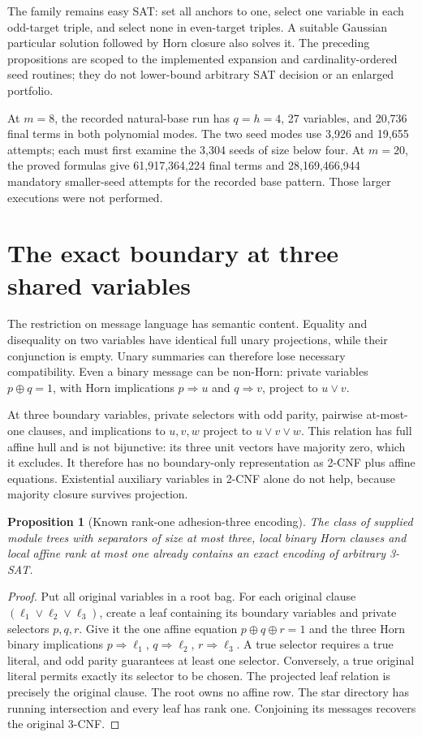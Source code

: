 \documentclass[11pt]{article}
\newtheorem{proposition}[theorem]{Proposition}
\begin{document}
The family remains easy SAT: set all anchors to one, select one variable in
each odd-target triple, and select none in even-target triples. A suitable
Gaussian particular solution followed by Horn closure also solves it.
The preceding propositions are scoped to the implemented expansion and
cardinality-ordered seed routines; they do not lower-bound arbitrary SAT
decision or an enlarged portfolio.

At \(m=8\), the recorded natural-base run has \(q=h=4\), 27 variables,
and 20,736 final terms in both polynomial modes. The two seed modes use
3,926 and 19,655 attempts; each must first examine the 3,304 seeds of size
below four. At \(m=20\), the proved formulas give 61,917,364,224 final terms
and 28,169,466,944 mandatory smaller-seed attempts for the recorded base
pattern. Those larger executions were not performed.

\section{The exact boundary at three shared variables}
The restriction on message language has semantic content. Equality and
disequality on two variables have identical full unary projections, while
their conjunction is empty. Unary summaries can therefore lose necessary
compatibility. Even a binary message can be non-Horn: private variables
\(p\oplus q=1\), with Horn implications \(p\Rightarrow u\) and
\(q\Rightarrow v\), project to \(u\lor v\).

At three boundary variables, private selectors with odd parity, pairwise
at-most-one clauses, and implications to \(u,v,w\) project to
\(u\lor v\lor w\). This relation has full affine hull and is not
bijunctive: its three unit vectors have majority zero, which it excludes.
It therefore has no boundary-only representation as 2-CNF plus affine
equations. Existential auxiliary variables in 2-CNF alone do not help,
because majority closure survives projection.

\begin{proposition}[Known rank-one adhesion-three encoding]
The class of supplied module trees with separators of size at most three,
local binary Horn clauses and local affine rank at most one already contains
an exact encoding of arbitrary 3-SAT.
\end{proposition}
\begin{proof}
Put all original variables in a root bag. For each original clause
\((\ell_1\lor\ell_2\lor\ell_3)\), create a leaf containing its boundary
variables and private selectors \(p,q,r\). Give it the one affine equation
\(p\oplus q\oplus r=1\) and the three Horn binary implications
\(p\Rightarrow\ell_1\), \(q\Rightarrow\ell_2\),
\(r\Rightarrow\ell_3\). A true selector requires a true literal, and
odd parity guarantees at least one selector. Conversely, a true original
literal permits exactly its selector to be chosen. The projected leaf
relation is precisely the original clause. The root owns no affine row.
The star directory has running intersection and every leaf has rank one.
Conjoining its messages recovers the original 3-CNF.
\end{proof}
\end{document}
